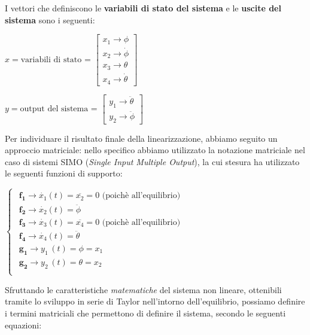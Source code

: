 I vettori che definiscono le \textbf{variabili di stato del sistema} e le \textbf{uscite del sistema} sono i seguenti:
\begin{center}
	$
	x=\text{variabili di stato = }\left\lbrack 
	\begin{array}{c}
		x_1 \to \phi\\
		x_2 \to \dot{\phi}\\
		x_3 \to \theta\\
		x_4 \to \dot{\theta} 
	\end{array}\right\rbrack
	$
	
	$
	y=\text{output del sistema = }\left\lbrack 
	\begin{array}{c}
		y_1 \to \ddot{\theta}\\
		y_2 \to \ddot{\phi}
	\end{array}\right\rbrack
	$
\end{center}

Per individuare il risultato finale della linearizzazione, abbiamo seguito un approccio matriciale: nello specifico abbiamo utilizzato la notazione matriciale nel caso di sistemi SIMO (\textit{Single Input Multiple Output}), la cui stesura ha utilizzato le seguenti funzioni di supporto:

\begin{center}
	$
	\begin{cases}
		\begin{array}{c}
			\mathbf{f_1} \to {\dot{x_1} \left(t\right)} =\overline{x_2 } =0\text{ (poichè all'equilibrio)}\\
			\mathbf{f_2} \to {\dot{x_2} \left(t\right)} = {\ddot{\phi} \;}\\
			\mathbf{f_3} \to {\dot{x_3} \left(t\right)} =\overline{x_4 } =0\text{ (poichè all'equilibrio)}\\
			\mathbf{f_4} \to {\dot{x_4} \left(t\right)=} {\ddot{\theta} \;}\\
			\mathbf{g_1} \to y_{1\;} \left(t\right)=\phi = x_{1\;}\\
			\mathbf{g_2} \to y_{2\;} \left(t\right)=\theta =x_{2\;}\\
		\end{array}
	\end{cases}
	$
\end{center}

Sfruttando le caratteristiche \textit{matematiche} del sistema non lineare, ottenibili tramite lo sviluppo in serie di Taylor nell'intorno dell'equilibrio, possiamo definire i termini matriciali che permettono di definire il sistema, secondo le seguenti equazioni:

